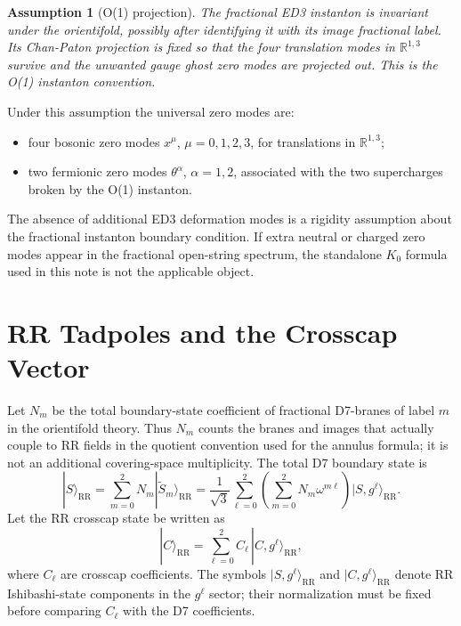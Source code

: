 \documentclass[11pt]{article}
\newcommand{\R}{\mathbb{R}}
\newcommand{\wt}{\widetilde}
\newcommand{\RR}{\mathrm{RR}}
\newtheorem{assumption}{Assumption}
\begin{document}
\begin{assumption}[O(1) projection]
The fractional ED3 instanton is invariant under the orientifold, possibly after identifying it
with its image fractional label. Its Chan-Paton projection is fixed so that the four
translation modes in $\R^{1,3}$ survive and the unwanted gauge ghost zero modes are projected
out. This is the O(1) instanton convention.
\end{assumption}

Under this assumption the universal zero modes are:
\begin{itemize}
\item four bosonic zero modes $x^\mu$, $\mu=0,1,2,3$, for translations in $\R^{1,3}$;
\item two fermionic zero modes $\theta^\alpha$, $\alpha=1,2$, associated with the two
supercharges broken by the O(1) instanton.
\end{itemize}
The absence of additional ED3 deformation modes is a rigidity assumption about the fractional
instanton boundary condition. If extra neutral or charged zero modes appear in the fractional
open-string spectrum, the standalone \(K_0\) formula used in this note is not the applicable
object.

\section{RR Tadpoles and the Crosscap Vector}

Let $N_m$ be the total boundary-state coefficient of fractional D7-branes of label $m$ in the
orientifold theory. Thus $N_m$ counts the branes and images that actually couple to RR fields in
the quotient convention used for the annulus formula; it is not an additional covering-space
multiplicity. The total D7 boundary state is
\begin{equation}
  |S\rangle_{\RR}
  =
  \sum_{m=0}^{2}N_m|\wt S_m\rangle_{\RR}
  =
  \frac{1}{\sqrt{3}}\sum_{\ell=0}^{2}
  \left(\sum_{m=0}^{2}N_m\omega^{m\ell}\right)
  |S,g^\ell\rangle_{\RR}.
  \label{eq:D7-boundary-vector}
\end{equation}
Let the RR crosscap state be written as
\begin{equation}
  |C\rangle_{\RR}
  =
  \sum_{\ell=0}^{2}C_\ell\,|C,g^\ell\rangle_{\RR},
  \label{eq:crosscap-vector}
\end{equation}
where $C_\ell$ are crosscap coefficients. The symbols $|S,g^\ell\rangle_{\RR}$ and
$|C,g^\ell\rangle_{\RR}$ denote RR Ishibashi-state components in the $g^\ell$ sector; their
normalization must be fixed before comparing $C_\ell$ with the D7 coefficients.
\end{document}
